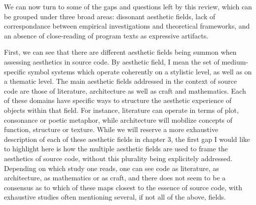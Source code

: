 We can now turn to some of the gaps and questions left by this review, which can be grouped under three broad areas: dissonant aesthetic fields, lack of correspondance between empirical investigations and theoretical frameworks, and an absence of close-reading of program texts as expressive artifacts.

First, we can see that there are different aesthetic fields being summon when assessing aesthetics in source code. By aesthetic field, I mean the set of medium-specific symbol systems which operate coherently on a stylistic level, as well as on a thematic level. The main aesthetic fields addressed in the context of source code are those of literature, architecture as well as craft and mathematics. Each of these domains have specific ways to structure the aesthetic experience of objects within that field. For instance, literature can operate in terms of plot, consonance or poetic metaphor, while architecture will mobilize concepts of function, structure or texture. While we will reserve a more exhaustive description of each of these aesthetic fields in chapter 3, the first gap I would like to highlight here is how the multiple aesthetic fields are used to frame the aesthetics of source code, without this plurality being explicitely addressed. Depending on which study one reads, one can see code as literature, as architecture, as mathematics or as craft, and there does not seem to be a consensus as to which of these maps closest to the essence of source code, with exhaustive studies often mentioning several, if not all of the above, fields\cite{rapaport_philosophy_2005}.

